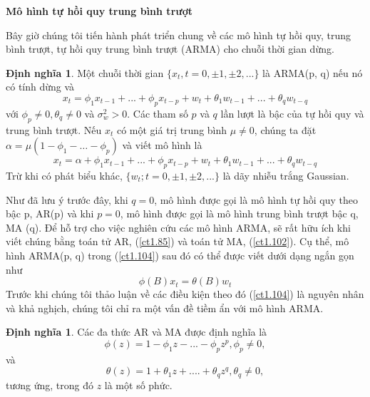 \documentclass[12pt, a4paper,oneside]{book}
\theoremstyle{definition}
\newtheorem{dn}[theo]{Định nghĩa}
\begin{document}
\textbf{Mô hình tự hồi quy trung bình trượt}

Bây giờ chúng tôi tiến hành phát triển chung về các mô hình tự hồi quy, trung bình trượt, tự hồi quy trung bình trượt (ARMA) cho chuỗi thời gian dừng.
\begin{dn}
Một chuỗi thời gian $ \{x_{t}, t=0,\pm1,\pm2,...\}$ là ARMA(p, q) nếu nó có tính dừng và 
\begin{equation}
 x_{t}= \phi_{1}x_{t-1}+...+\phi_{p}x_{t-p} + w_{t} + \theta_{1}w_{t-1}+...+ \theta_{q}w_{t-q} \label{ct1.104}
\end{equation}
 với $\phi_{p} \neq 0, \theta_q \neq $0 và $\sigma_{w}^{2}> 0$. Các tham số $p$ và $q$ lần lượt là bậc của tự hồi quy và trung bình trượt. Nếu $x_{t}$ có một giá trị trung bình $\mu \neq 0$, chúng ta đặt $\alpha = \mu(1 − \phi_{1} -\dots- \phi_{p})$ và viết mô hình là
\begin{equation}
x_{t}= \alpha + \phi_{1}x_{t-1}+...+\phi_{p}x_{t-p}+w_{t}+\theta_{1}w_{t-1}+...+\theta_{q}w_{t-q} \label{ct1.105}	
\end{equation}
Trừ khi có phát biểu khác, $\{w_{t}; t = 0, \pm 1, \pm 2, ...\}$ là dãy nhiễu trắng Gaussian.
\end{dn}
	
Như đã lưu ý trước đây, khi $q = 0$, mô hình được gọi là mô hình tự hồi quy theo bậc p, AR(p) và khi $p = 0$, mô hình được gọi là mô hình trung bình trượt bậc q, MA (q). Để hỗ trợ cho việc nghiên cứu các mô hình ARMA, sẽ rất hữu ích khi viết chúng bằng toán tử AR, (\ref{ct1.85}) và toán tử MA, (\ref{ct1.102}). Cụ thể, mô hình ARMA(p, q) trong (\ref{ct1.104}) sau đó có thể được viết dưới dạng ngắn gọn như
\begin{equation}
\phi(B)x_{t}= \theta(B)w_{t} \label{ct1.106}
\end{equation}	
Trước khi chúng tôi thảo luận về các điều kiện theo đó (\ref{ct1.104}) là nguyên nhân và khả nghịch, chúng tôi chỉ ra một vấn đề tiềm ẩn với mô hình ARMA. 
\begin{dn}
Các đa thức AR và MA được định nghĩa là 
\begin{equation}
\phi(z)= 1 - \phi_{1}z - ... - \phi_{p}z^{p}, \phi_{p}\neq 0, \label{ct1.107}
\end{equation}	
	và
\begin{equation}
\theta(z)= 1+ \theta_{1}z + ....+\theta_{q}z^{q},\theta_{q}\neq 0, \label{ct1.108}
\end{equation}
tương ứng, trong đó $z$ là một số phức.
\end{dn}
	
\end{document}
